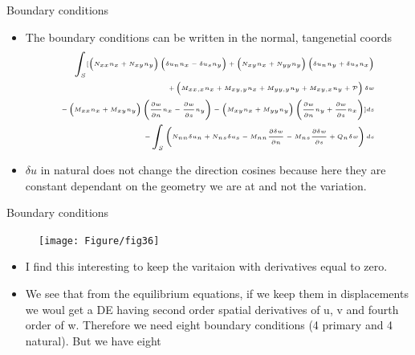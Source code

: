 	\begin{frame}{Boundary conditions}
		\begin{itemize}
			\item The boundary conditions can be written in the normal, tangenetial coords 
			\begin{equation}
			\tiny
			\begin{aligned}
			\int_S [ 
			\left(N_{xx}n_x + N_{xy}n_y\right)\left(\delta u_nn_x - \delta u_sn_y\right) +
			\left(N_{xy}n_x + N_{yy}n_y\right)\left(\delta u_nn_y + \delta u_sn_x\right) \\ +
			\left( M_{xx,x}n_x + M_{xy,y}n_x + M_{yy,y}n_y + M_{xy,x}n_y + \mathcal{P} \right) \delta w \\ - 
			\left(M_{xx}n_x + M_{xy}n_y \right)\left(\frac{\partial w}{\partial n} n_x 
			- \frac{\partial w}{\partial s}n_y \right) - 
			\left(M_{xy}n_x + M_{yy}n_y \right)\left(\frac{\partial w}{\partial n} n_y 
			+ \frac{\partial w}{\partial s}n_x \right)]ds\\
			 - \int_S \left(N_{nn} \delta u_n + N_{ns}\delta u_s - M_{nn}\frac{\partial \delta w}{\partial n} - M_{ns}\frac{\partial \delta w}{\partial s} + Q_n \delta w \right)ds
			\end{aligned} 
			\end{equation}
			\item $\delta u$ in natural does not change the direction cosines because here they are constant dependant on the geometry we are at and not the variation.
		\end{itemize}
	\end{frame}


	\begin{frame}{Boundary conditions}
		\begin{figure}
			\centering
			\texttt{[image: Figure/fig36]} 		
		\end{figure}
		\begin{itemize}
			\tiny
			\item I find this interesting to keep the varitaion with derivatives equal to zero.
			\item We see that from the equilibrium equations, if we keep them in displacements we woul get a DE having second order spatial derivatives of u, v and fourth order of w. Therefore we need eight boundary conditions (4 primary and 4 natural). But we have eight
		\end{itemize}
	\end{frame}


